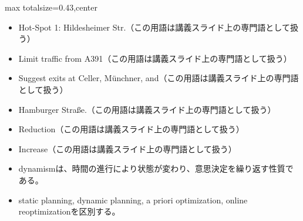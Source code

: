 \clearpage
{}
\begin{minipage}[t]{0.405\textwidth}
\begin{adjustbox}{max totalsize={\textwidth}{0.43\textheight},center}
\begin{minipage}{\textwidth}\scriptsize
{}\begin{itemize}
\item Hot-Spot 1: Hildesheimer Str.（この用語は講義スライド上の専門語として扱う）
\item Limit traffic from A391（この用語は講義スライド上の専門語として扱う）
\item Suggest exits at Celler, Münchner, and（この用語は講義スライド上の専門語として扱う）
\item Hamburger Straße.（この用語は講義スライド上の専門語として扱う）
\item Reduction（この用語は講義スライド上の専門語として扱う）
\item Increase（この用語は講義スライド上の専門語として扱う）
\end{itemize}\begin{itemize}
\item dynamismは、時間の進行により状態が変わり、意思決定を繰り返す性質である。
\item static planning, dynamic planning, a priori optimization, online reoptimizationを区別する。
\end{itemize}
\end{minipage}
\end{adjustbox}
\end{minipage}\hfill
